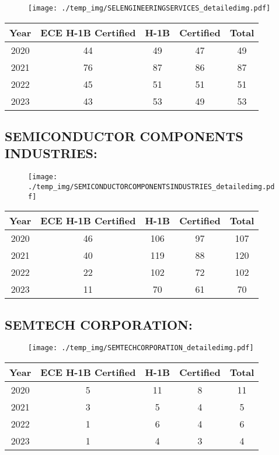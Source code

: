 \documentclass{article}%
\begin{document}
\begin{figure}[htbp]%
\centering%
\texttt{[image: ./temp\_img/SELENGINEERINGSERVICES\_detailedimg.pdf]}%
\end{figure}

%
\begin{longtable}{c|c|c|c|c}%
\hline%
Year&ECE H{-}1B Certified&H{-}1B&Certified&Total\\%
\hline%
2020&44&49&47&49\\%
\hline%
2021&76&87&86&87\\%
\hline%
2022&45&51&51&51\\%
\hline%
2023&43&53&49&53\\%
\hline%
\end{longtable}

%
\newpage%
\subsection{SEMICONDUCTOR COMPONENTS INDUSTRIES:}%
\label{subsec:SEMICONDUCTORCOMPONENTSINDUSTRIES}%
\label{SEMICONDUCTORCOMPONENTSINDUSTRIESdetailed}%


\begin{figure}[htbp]%
\centering%
\texttt{[image: ./temp\_img/SEMICONDUCTORCOMPONENTSINDUSTRIES\_detailedimg.pdf]}%
\end{figure}

%
\begin{longtable}{c|c|c|c|c}%
\hline%
Year&ECE H{-}1B Certified&H{-}1B&Certified&Total\\%
\hline%
2020&46&106&97&107\\%
\hline%
2021&40&119&88&120\\%
\hline%
2022&22&102&72&102\\%
\hline%
2023&11&70&61&70\\%
\hline%
\end{longtable}

%
\newpage%
\subsection{SEMTECH CORPORATION:}%
\label{subsec:SEMTECHCORPORATION}%
\label{SEMTECHCORPORATIONdetailed}%


\begin{figure}[htbp]%
\centering%
\texttt{[image: ./temp\_img/SEMTECHCORPORATION\_detailedimg.pdf]}%
\end{figure}

%
\begin{longtable}{c|c|c|c|c}%
\hline%
Year&ECE H{-}1B Certified&H{-}1B&Certified&Total\\%
\hline%
2020&5&11&8&11\\%
\hline%
2021&3&5&4&5\\%
\hline%
2022&1&6&4&6\\%
\hline%
2023&1&4&3&4\\%
\hline%
\end{longtable}
\end{document}
